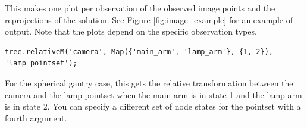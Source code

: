 This makes one plot per observation of the observed image points and the reprojections of the solution.
See Figure \ref{fig:image_example} for an example of output. Note that the plots depend on the specific
observation types.

\begin{verbatim}
tree.relativeM('camera', Map({'main_arm', 'lamp_arm'}, {1, 2}), 'lamp_pointset');
\end{verbatim}

For the spherical gantry case, this gets the relative transformation between the camera and the lamp pointset 
when the main arm is in state 1 and the lamp arm is in state 2. You can specify a different set of node states for the pointset
with a fourth argument.

